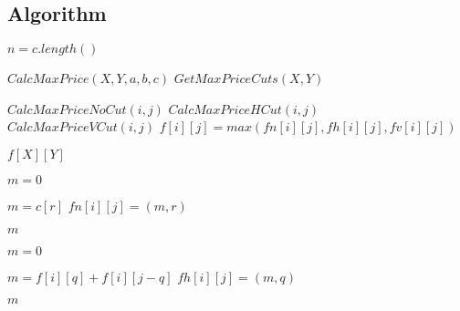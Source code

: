 \documentclass{article}
\begin{document}
    \subsection*{Algorithm}
        \begin{algorithm}[H]
            \begin{algorithmic}
                    \State $n = c.length()$

                    \State $CalcMaxPrice(X, Y, a, b, c)$
                    \State \Return $GetMaxPriceCuts(X, Y)$
                \EndProcedure

                            \State $CalcMaxPriceNoCut(i, j)$
                            \State $CalcMaxPriceHCut(i, j)$
                            \State $CalcMaxPriceVCut(i, j)$
                            \State $f[i][j] = max(fn[i][j], fh[i][j], fv[i][j])$
                        \EndFor
                    \EndFor

                    \State \Return $f[X][Y]$
                \EndProcedure

                    \State $m = 0$

                                \State $m = c[r]$
                                \State $fn[i][j] = (m, r)$
                            \EndIf
                        \EndIf
                    \EndFor

                    \State \Return $m$
                \EndProcedure

                    \State $m = 0$

                                \State $m = f[i][q] + f[i][j-q]$
                                \State $fh[i][j] = (m, q)$
                            \EndIf
                        \EndFor
                    \EndIf

                    \State \Return $m$
                \EndProcedure


\end{algorithmic}
\end{algorithm}
\end{document}
